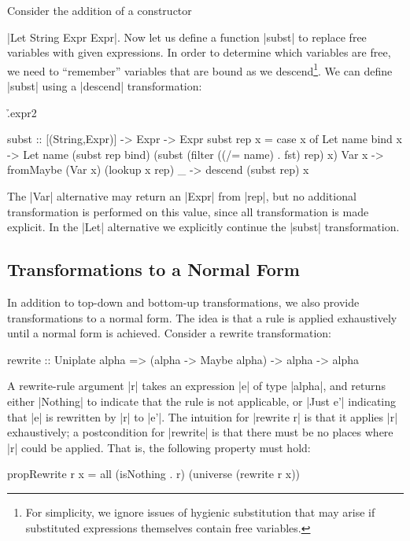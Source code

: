 \begin{example}
Consider the addition of a constructor \ignore|Let String Expr Expr|. Now let us define a function |subst| to replace free variables with given expressions. In order to determine which variables are free, we need to ``remember'' variables that are bound as we descend\footnote{For simplicity, we ignore issues of hygienic substitution that may arise if substituted expressions themselves contain free variables.}. We can define |subst| using a |descend| transformation:

\h{.expr2}\begin{code}
subst :: [(String,Expr)] -> Expr -> Expr
subst rep x =
    case  x of
          Let name bind x -> Let name (subst rep bind)
              (subst (filter ((/= name) . fst) rep) x)
          Var x -> fromMaybe (Var x) (lookup x rep)
          _ -> descend (subst rep) x
\end{code}

The |Var| alternative may return an |Expr| from |rep|, but no additional transformation is performed on this value, since all transformation is made explicit. In the |Let| alternative we explicitly continue the |subst| transformation.
\end{example}

\subsection{Transformations to a Normal Form}

In addition to top-down and bottom-up transformations, we also provide transformations to a normal form. The idea is that a rule is applied exhaustively until a normal form is achieved. Consider a rewrite transformation:

\begin{code}
rewrite :: Uniplate alpha => (alpha -> Maybe alpha) -> alpha -> alpha
\end{code}

A rewrite-rule argument |r| takes an expression |e| of type |alpha|, and returns either |Nothing| to indicate that the rule is not applicable, or |Just e'| indicating that |e| is rewritten by |r| to |e'|. The intuition for |rewrite r| is that it applies |r| exhaustively; a postcondition for |rewrite| is that there must be no places where |r| could be applied. That is, the following property must hold:

\begin{code}
propRewrite r x = all (isNothing . r) (universe (rewrite r x))
\end{code}


